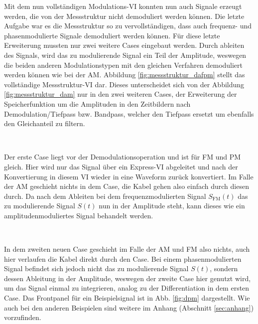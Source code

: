 \pagestyle{headings}
Mit dem nun vollständigen Modulations-VI konnten nun auch Signale erzeugt werden, die von der Messstruktur nicht demoduliert werden können.
Die letzte Aufgabe war es die Messstruktur so zu vervollständigen, dass auch frequenz- und phasenmodulierte Signale demoduliert werden können.
Für diese letzte Erweiterung mussten nur zwei weitere Cases eingebaut werden.
Durch ableiten des Signals, wird das zu modulierende Signal ein Teil der Amplitude, weswegen die beiden anderen Modulationstypen mit den gleichen Verfahren demoduliert werden können wie bei der AM.
Abbildung \ref{fig:messstruktur_dafpm} stellt das vollständige Messstruktur-VI dar.
Dieses unterscheidet sich von der Abbildung \ref{fig:messstruktur_dam} nur in den zwei weiteren Cases, der Erweiterung der Speicherfunktion um die Amplituden in den Zeitbildern nach Demodulation/Tiefpass bzw. Bandpass, welcher den Tiefpass ersetzt um ebenfalls den Gleichanteil zu filtern.
	
\

Der erste Case liegt vor der Demodulationsoperation und ist für FM und PM gleich.
Hier wird nur das Signal über ein Express-VI abgeleitet und nach der Konvertierung in diesem VI wieder in eine Waveform zurück konvertiert.
Im Falle der AM geschieht nichts in dem Case, die Kabel gehen also einfach durch diesen durch.
Da nach dem Ableiten bei dem frequenzmodulierten Signal $S_\text{FM}(t)$ das zu modulierende Signal $S(t)$ nun in der Amplitude steht, kann dieses wie ein amplitudenmoduliertes Signal behandelt werden.
	
\

In dem zweiten neuen Case geschieht im Falle der AM und FM also nichts, auch hier verlaufen die Kabel direkt durch den Case.
Bei einem phasenmodulierten Signal befindet sich jedoch nicht das zu modulierende Signal $S(t)$, sondern dessen Ableitung in der Amplitude, weswegen der zweite Case hier genutzt wird, um das Signal einmal zu integrieren, analog zu der Differentiation in dem ersten Case.
Das Frontpanel für ein Beispielsignal ist in Abb. \ref{fig:dpm} dargestellt. 
Wie auch bei den anderen Beispielen sind weitere im Anhang (Abschnitt \ref{sec:anhang}) vorzufinden.

